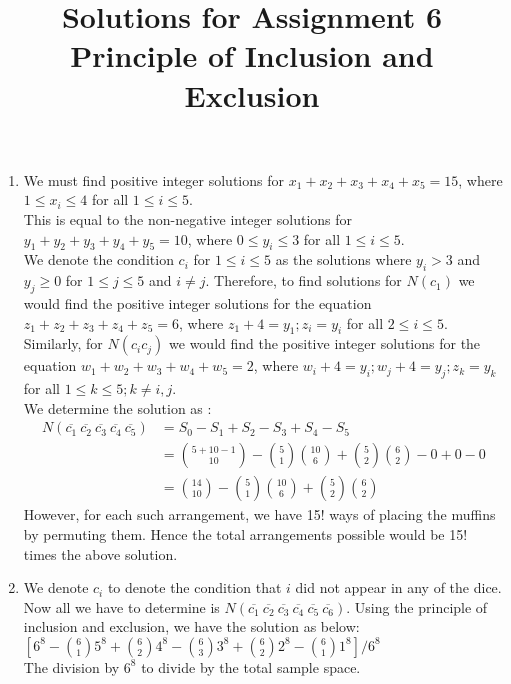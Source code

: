 \documentclass[a4paper]{article}
\title{Solutions for Assignment 6\\ Principle of Inclusion and Exclusion}
\date{}
\begin{document}
\maketitle

\begin{enumerate}
   
\item We must find positive integer solutions for $x_1+x_2+x_3+x_4+x_5=15$, where $1\leq x_i\leq 4$ for all $1 \leq i \leq 5$.\\
This is equal to the non-negative integer solutions for $y_1+y_2+y_3+y_4+y_5=10$, where $0\leq y_i\leq 3$ for all $1 \leq i \leq 5$.\\
We denote the condition $c_i$ for $1 \leq i \leq 5$ as the solutions where $y_i >3$ and $y_j \geq 0$ for $1\leq j\leq 5$ and $i \neq j$. Therefore, to find solutions for $N(c_1)$ we would find the positive integer solutions for the equation $z_1+z_2+z_3+z_4+z_5=6$, where $z_1+4=y_1;z_i=y_i$ for all $2 \leq i \leq 5$.\\

Similarly, for $N(c_ic_j)$ we would find the positive integer solutions for the equation $w_1+w_2+w_3+w_4+w_5=2$, where $w_i+4=y_i;w_j+4=y_j;z_k=y_k$ for all $1 \leq k \leq 5; k \neq i,j$.\\

We determine the solution as :
\begin{align*}
N(\overline{c_1}~\overline{c_2}~\overline{c_3}~\overline{c_4}~\overline{c_5}) &= S_0-S_1+S_2-S_3+S_4-S_5 \\
& = {{5+10-1} \choose 10} - {5 \choose 1}{10\choose 6} + {5\choose 2}{6\choose 2}-0+0-0\\
&= {14\choose 10}- {5 \choose 1}{10\choose 6} + {5\choose 2}{6\choose 2}
\end{align*}
However, for each such arrangement, we have 15! ways of placing the muffins by permuting them. Hence the total arrangements possible would be 15! times the above solution. 


\item We denote $c_i$ to denote the condition that $i$ did not appear in any of the dice. Now all we have to determine is $N(\overline{c_1}~\overline{c_2}~\overline{c_3}~\overline{c_4}~\overline{c_5}~\overline{c_6})$. Using the principle of inclusion and exclusion, we have the solution as below:\\
$[6^8-{6\choose 1}{5^8}+{6\choose 2}{4^8}-{6\choose 3}{3^8}+{6\choose 2}{2^8}-{6\choose 1}{1^8}]/6^8$\\
The division by $6^8$ to divide by the total sample space.


\end{enumerate}
\end{document}
